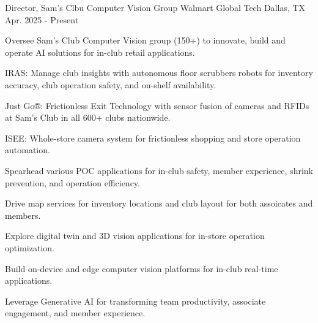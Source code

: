 

\begin{cventries}

	\cventry
		{Director, Sam's Clbu Computer Vision Group} %
		{Walmart Global Tech} %
		{Dallas, TX} %
		{Apr. 2025 - Present} %
		{
			\begin{cvitems} %
        \item {Oversee Sam's Club Computer Vision group (150+) to innovate, build and operate AI solutions for in-club retail applications.}
          \vspace{4mm}
          \begin{cvitems}
            \item {IRAS: Manage club insights with autonomous floor scrubbers robots for inventory accuracy, club operation safety, and on-shelf availability.}
            \item {Just Go®: Frictionless Exit Technology with sensor fusion of cameras and RFIDs at Sam’s Club in all 600+ clubs nationwide.}
            \item {ISEE: Whole-store camera system for frictionless shopping and store operation automation.}
          \end{cvitems}
        \item {Spearhead various POC applications for in-club safety, member experience, shrink prevention, and operation efficiency.}
          \vspace{4mm}
          \begin{cvitems}
            \item {Drive map services for inventory locations and club layout for both assoicates and members.}
            \item {Explore digital twin and 3D vision applications for in-store operation optimization.}
            \item {Build on-device and edge computer vision platforms for in-club real-time applications.}
            \item {Leverage Generative AI for transforming team productivity, associate engagement, and member experience.}

\end{cvitems}
\end{cvitems}}
\end{cventries}
